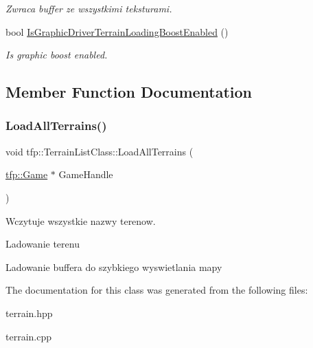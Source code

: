 \begin{DoxyCompactItemize}
\begin{DoxyCompactList}\small\item\em Zwraca buffer ze wszystkimi teksturami. \end{DoxyCompactList}\item 
\mbox{\label{classtfp_1_1_terrain_list_class_aa46f064673cb916be9be084ca534b93d}} 
bool \mbox{\hyperlink{classtfp_1_1_terrain_list_class_aa46f064673cb916be9be084ca534b93d}{Is\+Graphic\+Driver\+Terrain\+Loading\+Boost\+Enabled}} ()
\begin{DoxyCompactList}\small\item\em Is graphic boost enabled. \end{DoxyCompactList}\end{DoxyCompactItemize}


\subsection{Member Function Documentation}
\mbox{\label{classtfp_1_1_terrain_list_class_ae1fb1543a71f4e9fb7aa54ad25adcda4}} 
\subsubsection{\texorpdfstring{Load\+All\+Terrains()}{LoadAllTerrains()}}
{\footnotesize\ttfamily void tfp\+::\+Terrain\+List\+Class\+::\+Load\+All\+Terrains (\begin{DoxyParamCaption}\item[{\mbox{\hyperlink{classtfp_1_1_game}{tfp\+::\+Game}} $\ast$}]{Game\+Handle }\end{DoxyParamCaption})}



Wczytuje wszystkie nazwy terenow. 

Ladowanie terenu

Ladowanie buffera do szybkiego wyswietlania mapy 

The documentation for this class was generated from the following files\+:\begin{DoxyCompactItemize}
\item 
terrain.\+hpp\item 
terrain.\+cpp\end{DoxyCompactItemize}
